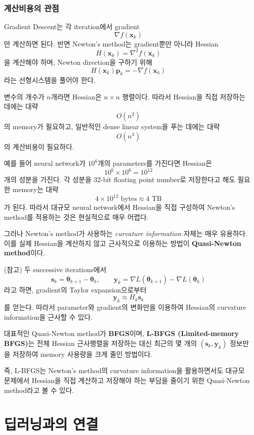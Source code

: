 \documentclass[11pt,a4paper]{article}
\begin{document}
\subsubsection{계산비용의 관점}

Gradient Descent는 각 iteration에서 gradient
\[
\nabla f(\mathbf{x}_k)
\]
만 계산하면 된다. 반면 Newton's method는 gradient뿐만 아니라 Hessian
\[
H(\mathbf{x}_k)=\nabla^2 f(\mathbf{x}_k)
\]
을 계산해야 하며, Newton direction을 구하기 위해
\[
H(\mathbf{x}_k)\mathbf{p}_k
=
-\nabla f(\mathbf{x}_k)
\]
라는 선형시스템을 풀어야 한다.

변수의 개수가 $n$개라면 Hessian은 $n\times n$ 행렬이다.
따라서 Hessian을 직접 저장하는 데에는 대략
\[
O(n^2)
\]
의 memory가 필요하고, 일반적인 dense linear system을 푸는 데에는
대략
\[
O(n^3)
\]
의 계산비용이 필요하다.

예를 들어 neural network가 $10^6$개의 parameters를 가진다면 Hessian은
\[
10^6\times 10^6=10^{12}
\]
개의 성분을 가진다. 각 성분을 32-bit floating point number로
저장한다고 해도 필요한 memory는 대략
\[
4\times 10^{12}\text{ bytes}\approx 4\text{ TB}
\]
가 된다. 따라서 대규모 neural network에서 Hessian을 직접 구성하여
Newton's method를 적용하는 것은 현실적으로 매우 어렵다.

그러나 Newton's method가 사용하는 \emph{curvature information} 자체는
매우 유용하다. 이를 실제 Hessian을 계산하지 않고 근사적으로 이용하는
방법이 \textbf{Quasi-Newton method}이다.

(참고) 두 successive iterations에서
\[
\mathbf{s}_k
=
\boldsymbol{\theta}_{k+1}-\boldsymbol{\theta}_k,
\qquad
\mathbf{y}_k
=
\nabla L(\boldsymbol{\theta}_{k+1})
-
\nabla L(\boldsymbol{\theta}_k)
\]
라고 하면, gradient의 Taylor expansion으로부터
\[
\mathbf{y}_k
\approx
H_k\mathbf{s}_k
\]
를 얻는다. 따라서 parameter와 gradient의 변화만을 이용하여
Hessian의 curvature information을 근사할 수 있다.

대표적인 Quasi-Newton method가 \textbf{BFGS}이며,
\textbf{L-BFGS (Limited-memory BFGS)}는 전체 Hessian 근사행렬을
저장하는 대신 최근의 몇 개의
$(\mathbf{s}_k,\mathbf{y}_k)$ 정보만을 저장하여 memory 사용량을
크게 줄인 방법이다.

즉, L-BFGS는 Newton's method의 curvature information을 활용하면서도
대규모 문제에서 Hessian을 직접 계산하고 저장해야 하는 부담을
줄이기 위한 Quasi-Newton method라고 볼 수 있다.


\section{딥러닝과의 연결}
\end{document}

